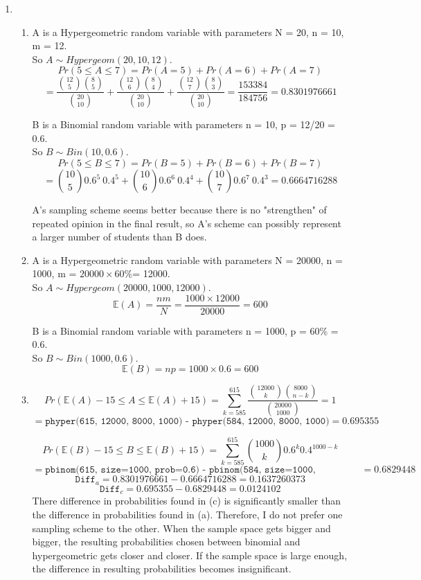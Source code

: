 \documentclass[11pt]{article}
\begin{document}
\begin{enumerate}[label=\textbf{Question \arabic*:},start=1]
\item 
\begin{enumerate}
  \item A is a Hypergeometric random variable with parameters N = 20, n = 10, m = 12. \\
So \( A \sim Hypergeom(20, 10, 12) \).\\
\[
Pr(5 \leq A \leq 7) = Pr(A = 5) + Pr(A = 6) + Pr(A = 7)
\]
\[
= \frac{{12 \choose 5} {8 \choose 5} }{{20 \choose 10}} + \frac{{12 \choose 6} {8 \choose 4}}{{20 \choose 10}} + \frac{{12 \choose 7} {8 \choose 3}}{{20 \choose 10}} = \frac{153384}{184756} = 0.8301976661
\]

B is a Binomial random variable with parameters n = 10, p = 12/20 = 0.6.\\
So \( B \sim Bin(10, 0.6) \). \\
\[
Pr(5 \leq B \leq 7) = Pr(B = 5) + Pr(B = 6) + Pr(B = 7) 
\]
\[
= {10 \choose 5} 0.6^5 \ 0.4^5 + {10 \choose 6} 0.6^6 \ 0.4^4 + {10 \choose 7} 0.6^7 \ 0.4^3 = 0.6664716288
\]

A's sampling scheme seems better because there is no "strengthen" of repeated opinion in the final result, so A's scheme can possibly represent a larger number of students than B does.\\

  \item A is a Hypergeometric random variable with parameters N = 20000, n = 1000, m = \( 20000 \times 60\% \)= 12000. \\
So \( A \sim Hypergeom(20000, 1000, 12000) \).\\
\[
\mathbb{E}(A) = \frac{ n m }{N} = \frac{1000 \times 12000}{20000} = 600
\]

B is a Binomial random variable with parameters n = 1000, p = 60\% = 0.6.\\
So \( B \sim Bin(1000, 0.6) \). \\
\[
\mathbb{E}(B) = np = 1000 \times 0.6 = 600
\]

  \item 
  
\[
Pr(\mathbb{E}(A) - 15 \leq A \leq \mathbb{E}(A) + 15) = \sum_{k = 585}^{615} \frac{{12000 \choose k} {8000 \choose n-k}}{{20000 \choose 1000}} = 1
\]
\[
= \texttt{phyper(615, 12000, 8000, 1000) - phyper(584, 12000, 8000, 1000)} = 0.695355
\]

\[
Pr(\mathbb{E}(B) - 15 \leq B \leq \mathbb{E}(B) + 15) = \sum_{k = 585}^{615} {1000 \choose k} 0.6^k 0.4^{1000-k}
\]
\[
= \texttt{pbinom(615, size=1000, prob=0.6) - pbinom(584, size=1000, prob=0.6)} = 0.6829448
\]
\[
\texttt{Diff}_a = 0.8301976661 - 0.6664716288 = 0.1637260373
\]
\[
\texttt{Diff}_c = 0.695355 - 0.6829448 = 0.0124102
\]
There difference in probabilities found in (c) is significantly smaller than the difference in probabilities found in (a).
Therefore, I do not prefer one sampling scheme to the other. When the sample space gets bigger and bigger, the resulting probabilities chosen between binomial and hypergeometric gets closer and closer. If the sample space is large enough, the difference in resulting probabilities becomes insignificant.


\end{enumerate}
\end{enumerate}
\end{document}
